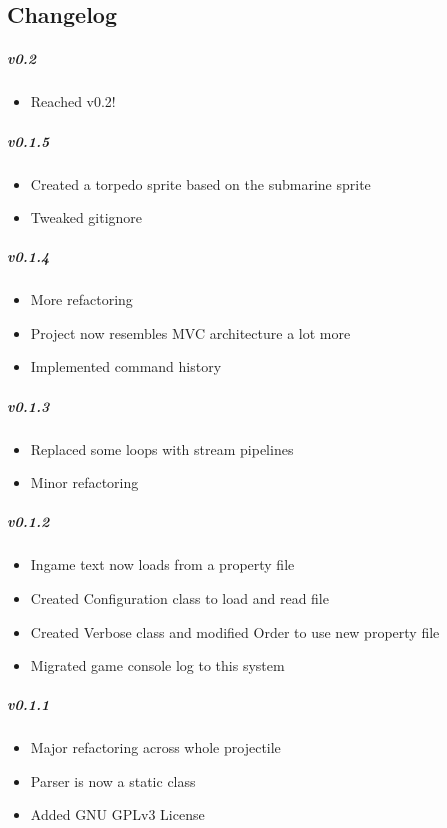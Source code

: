 \subsection*{Changelog}

\subparagraph{v0.2}

\begin{itemize}[noitemsep]
\item
  Reached v0.2!
\end{itemize}

\subparagraph{v0.1.5}

\begin{itemize}[noitemsep]
\item
  Created a torpedo sprite based on the submarine sprite
\item
  Tweaked gitignore
\end{itemize}

\subparagraph{v0.1.4}

\begin{itemize}[noitemsep]
\item
  More refactoring
\item
  Project now resembles MVC architecture a lot more
\item
  Implemented command history
\end{itemize}

\subparagraph{v0.1.3}

\begin{itemize}[noitemsep]
\item
  Replaced some loops with stream pipelines
\item
  Minor refactoring
\end{itemize}

\subparagraph{v0.1.2}

\begin{itemize}[noitemsep]
\item
  Ingame text now loads from a property file
\item
  Created Configuration class to load and read file
\item
  Created Verbose class and modified Order to use new property file
\item
  Migrated game console log to this system
\end{itemize}

\subparagraph{v0.1.1}

\begin{itemize}[noitemsep]
\item
  Major refactoring across whole projectile
\item
  Parser is now a static class
\item
  Added GNU GPLv3 License
\end{itemize}

